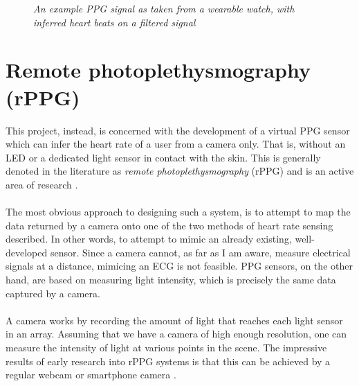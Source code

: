 \begin{figure}[H]
    \centering
    \subfloat{\scalebox{0.7}{}}
    \subfloat{\scalebox{0.7}{}}
   \caption{\textit{An example PPG signal as taken from a wearable watch, with inferred heart beats on a filtered signal} }
   \label{fig:wearable_ppg}
\end{figure}
\section{Remote photoplethysmography (rPPG)}
\label{ref:rPPG_prep}
This project, instead, is concerned with the development of a virtual PPG sensor which can infer the heart rate of a user from a camera only.
That is, without an LED or a dedicated light sensor in contact with the skin. 
This is generally denoted in the literature as \textit{remote photoplethysmography} (rPPG) and is an active area of research \cite{Verkruysse2008}\cite{poh}\cite{vanderKooij2019}.
\\\\
The most obvious approach to designing such a system, is to attempt to map the data returned by a camera onto one of the two methods of heart rate sensing described. In other words, to attempt 
to mimic an already existing, well-developed sensor.
Since a camera cannot, as far as I am aware, measure electrical signals at a distance, mimicing an ECG is not feasible. PPG sensors, on the other hand, are based on measuring light intensity, which is precisely the same data captured by a camera.
\\\\
A camera works by recording the amount of light that reaches each light sensor in an array. Assuming that we have a camera of high enough resolution, one can measure the intensity of light 
at various points in the scene. The impressive results of early research into rPPG systems is that this can be achieved by a regular webcam or smartphone camera \cite{Verkruysse2008}.
\\\\

